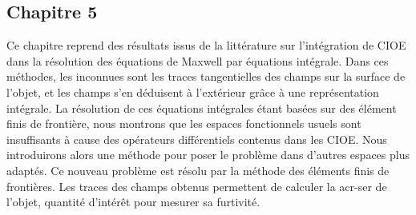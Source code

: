 \subsection*{Chapitre 5}
Ce chapitre reprend des résultats issus de la littérature sur l'intégration de CIOE dans la résolution des équations de Maxwell par équations intégrale.
Dans ces méthodes, les inconnues sont les traces tangentielles des champs sur la surface de l'objet, et les champs s'en déduisent à l'extérieur grâce à une représentation intégrale.
La résolution de ces équations intégrales étant basées sur des élément finis de frontière, nous montrons que les espaces fonctionnels usuels sont insuffisants à cause des opérateurs différentiels contenus dans les CIOE.
Nous introduirons alors une méthode pour poser le problème dans d'autres espaces plus adaptés. Ce nouveau problème est résolu par la méthode des éléments finis de frontières. Les traces des champs obtenus permettent de calculer la \gls{acr-ser} de l'objet, quantité d'intérêt pour mesurer sa furtivité.







